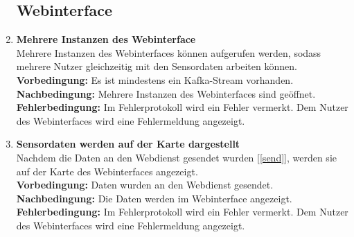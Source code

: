 \begin{enumerate}[label=\textbf{PF\arabic{enumi}0}]
	
	 	
	 
 
	 \subsection{Webinterface}
	 \setcounter{enumi}{199}
	 
	 \item \textbf{Mehrere Instanzen des Webinterface}\\
		 Mehrere Instanzen des Webinterfaces können aufgerufen werden, sodass mehrere Nutzer gleichzeitig mit den Sensordaten arbeiten können.\\
		 \textbf{Vorbedingung:} Es ist mindestens ein Kafka-Stream vorhanden.\\
		 \textbf{Nachbedingung:} Mehrere Instanzen des Webinterfaces sind geöffnet.\\
	 	\textbf{Fehlerbedingung:} Im Fehlerprotokoll wird ein Fehler vermerkt. Dem Nutzer des Webinterfaces wird eine Fehlermeldung angezeigt.

	 \item \textbf{Sensordaten werden auf der Karte dargestellt}\\
	 	Nachdem die Daten an den Webdienst gesendet wurden [\ref{send}], werden sie auf der Karte des Webinterfaces angezeigt.\\
	 	\textbf{Vorbedingung:} Daten wurden an den Webdienst gesendet.\\
	 	\textbf{Nachbedingung:} Die Daten werden im Webinterface angezeigt.\\
	 	\textbf{Fehlerbedingung:} Im Fehlerprotokoll wird ein Fehler vermerkt. Dem Nutzer des Webinterfaces wird eine Fehlermeldung angezeigt.
	 	

\end{enumerate}
